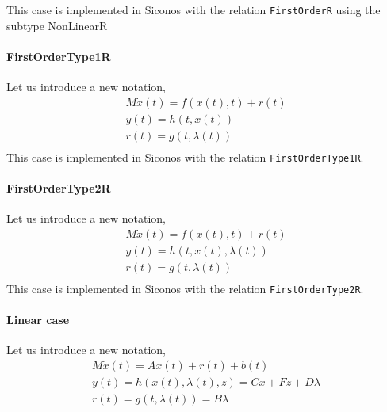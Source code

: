 This case is implemented in Siconos with the relation {\tt FirstOrderR} using the subtype {NonLinearR}

\paragraph{FirstOrderType1R}
Let us introduce a new notation,
\begin{equation}
\begin{array}{l}
M \dot{x}(t) = f(x(t),t) + r(t)  \\[2mm]
y(t) = h(t,x(t)) \\[2mm]
r(t) = g(t,\lambda (t) ) \\[2mm]
\end{array}
\label{first-DS2}
\end{equation}
This case is implemented in Siconos with the relation {\tt FirstOrderType1R}.



\paragraph{FirstOrderType2R}
Let us introduce a new notation, 
\begin{equation}
\begin{array}{l}
M \dot{x}(t) = f(x(t),t) + r(t)  \\[2mm]
y(t) = h(t,x(t),\lambda (t)) \\[2mm]
r(t) = g(t,\lambda (t) ) \\[2mm]
\end{array}
\label{first-DS2}
\end{equation}
This case is implemented in Siconos with the relation {\tt FirstOrderType2R}.




\paragraph{Linear case }Let us introduce a new notation, 
\begin{equation}
\begin{array}{l}
M \dot{x}(t) = Ax(t) + r(t)  +b(t)\\[2mm]
y(t) = h(x(t),\lambda (t),z) = Cx + Fz + D \lambda  \\[2mm]
r(t) = g(t,\lambda (t) ) = B \lambda \\[2mm]
\end{array}
\label{first-DS3}
\end{equation}


